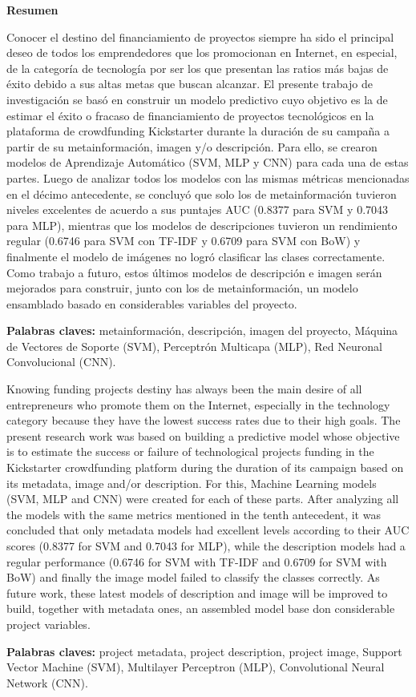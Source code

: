 \thispagestyle{plain}
\begin{center}
	{\Large \bfseries  Resumen}
\end{center}
\vspace{0.5cm}

Conocer el destino del financiamiento de proyectos siempre ha sido el principal deseo de todos los emprendedores que los promocionan en Internet, en especial, de la categoría de tecnología por ser los que presentan las ratios más bajas de éxito debido a sus altas metas que buscan alcanzar. El presente trabajo de investigación se basó en construir un modelo predictivo cuyo objetivo es la de estimar el éxito o fracaso de financiamiento de proyectos tecnológicos en la plataforma de crowdfunding Kickstarter durante la duración de su campaña a partir de su metainformación, imagen y/o descripción. Para ello, se crearon modelos de Aprendizaje Automático (SVM, MLP y CNN) para cada una de estas partes. Luego de analizar todos los modelos con las mismas métricas mencionadas en el décimo antecedente, se concluyó que solo los de metainformación tuvieron niveles excelentes de acuerdo a sus puntajes AUC (0.8377 para SVM y 0.7043 para MLP), mientras que los modelos de descripciones tuvieron un rendimiento regular (0.6746 para SVM con TF-IDF y 0.6709 para SVM con BoW) y finalmente el modelo de imágenes no logró clasificar las clases correctamente. Como trabajo a futuro, estos últimos modelos de descripción e imagen serán mejorados para construir, junto con los de metainformación, un modelo ensamblado basado en considerables variables del proyecto.

\textbf{Palabras claves: } metainformación, descripción, imagen del proyecto, Máquina de Vectores de Soporte (SVM), Perceptrón Multicapa (MLP), Red Neuronal Convolucional (CNN).

\vspace{0.5cm}
Knowing funding projects destiny has always been the main desire of all entrepreneurs who promote them on the Internet, especially in the technology category because they have the lowest success rates due to their high goals. The present research work was based on building a predictive model whose objective is to estimate the success or failure of technological projects funding in the Kickstarter crowdfunding platform during the duration of its campaign based on its metadata, image and/or description. For this, Machine Learning models (SVM, MLP and CNN) were created for each of these parts. After analyzing all the models with the same metrics mentioned in the tenth antecedent, it was concluded that only metadata models had excellent levels according to their AUC scores (0.8377 for SVM and 0.7043 for MLP), while the description models had a regular performance (0.6746 for SVM with TF-IDF and 0.6709 for SVM with BoW) and finally the image model failed to classify the classes correctly. As future work, these latest models of description and image will be improved to build, together with metadata ones, an assembled model base don considerable project variables.

\textbf{Palabras claves: } project metadata, project description, project image, Support Vector Machine (SVM), Multilayer Perceptron (MLP), Convolutional Neural Network (CNN).